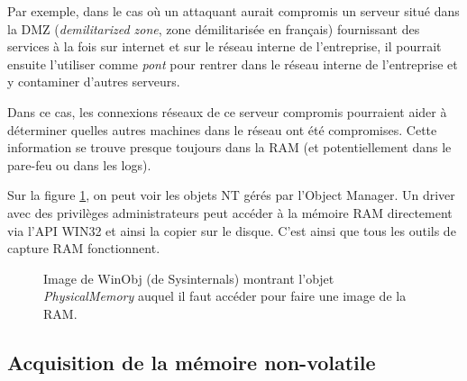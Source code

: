 \begin{example}
    \hspace{0.45cm} Par exemple, dans le cas où un attaquant aurait compromis un serveur situé dans la DMZ (\textit{demilitarized zone}, zone démilitarisée en français) fournissant des services à la fois sur internet et sur le réseau interne de l'entreprise, il pourrait ensuite l'utiliser comme \textit{pont} pour rentrer dans le réseau interne de l'entreprise et y contaminer d'autres serveurs.

    Dans ce cas, les connexions réseaux de ce serveur compromis pourraient aider à déterminer quelles autres machines dans le réseau ont été compromises. Cette information se trouve presque toujours dans la RAM (et potentiellement dans le pare-feu ou dans les logs).
\end{example}

Sur la figure \ref{fig:device-physicalmemory}, on peut voir les objets NT gérés par l'Object Manager. Un driver avec des privilèges administrateurs peut accéder à la mémoire RAM directement via l'API WIN32 et ainsi la copier sur le disque. C'est ainsi que tous les outils de capture RAM fonctionnent.


\begin{figure}
    \centering
    \caption{Image de WinObj (de Sysinternals) montrant l'objet \textit{PhysicalMemory} auquel il faut accéder pour faire une image de la RAM.}
    \label{fig:device-physicalmemory}
\end{figure}



\subsection{Acquisition de la mémoire non-volatile}

